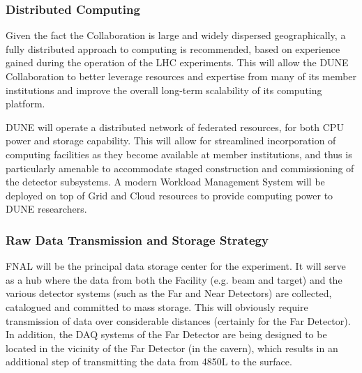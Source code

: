 \subsubsection{Distributed Computing}

Given the fact the Collaboration is large and widely dispersed geographically, a fully distributed approach to computing is recommended, based on experience
gained during the operation of the LHC experiments. This will allow the DUNE Collaboration to better leverage resources and expertise from many of its
member institutions and improve the overall long-term scalability of its computing platform.

DUNE will operate a  distributed network of federated resources, for both CPU power and storage capability. This will allow for streamlined incorporation
of computing facilities as they become available at member institutions, and thus is particularly amenable to accommodate staged construction and commissioning
of the detector subsystems. A modern Workload Management System will be deployed on top of Grid and Cloud resources to provide computing
power to DUNE researchers.

\subsubsection{Raw Data Transmission and Storage Strategy}
FNAL will be the principal data storage center for the experiment. It will serve as a hub where the data from both the Facility (e.g. beam and target)
and the various detector systems (such as the  Far and Near Detectors)  are collected, catalogued and committed to mass storage. This will obviously require transmission of
data over considerable distances (certainly for the Far Detector). In addition, the DAQ systems of the Far Detector are being designed to be located  in the vicinity of
the Far Detector (in the cavern), which results in an additional step of transmitting the data from 4850L to the surface.

